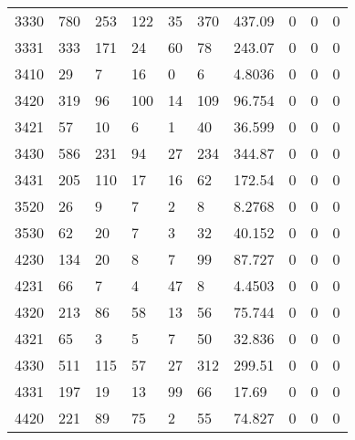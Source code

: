 \begin{longtable}{llllllllll}
3330 & 780           & 253              & 122                & 35               & 370                & 437.09 & 0 & 0 & 0 \\
3331 & 333           & 171              & 24                 & 60               & 78                 & 243.07 & 0 & 0 & 0 \\
3410 & 29            & 7                & 16                 & 0                & 6                  & 4.8036 & 0 & 0 & 0 \\
3420 & 319           & 96               & 100                & 14               & 109                & 96.754 & 0 & 0 & 0 \\
3421 & 57            & 10               & 6                  & 1                & 40                 & 36.599 & 0 & 0 & 0 \\
3430 & 586           & 231              & 94                 & 27               & 234                & 344.87 & 0 & 0 & 0 \\
3431 & 205           & 110              & 17                 & 16               & 62                 & 172.54 & 0 & 0 & 0 \\
3520 & 26            & 9                & 7                  & 2                & 8                  & 8.2768 & 0 & 0 & 0 \\
3530 & 62            & 20               & 7                  & 3                & 32                 & 40.152 & 0 & 0 & 0 \\
4230 & 134           & 20               & 8                  & 7                & 99                 & 87.727 & 0 & 0 & 0 \\
4231 & 66            & 7                & 4                  & 47               & 8                  & 4.4503 & 0 & 0 & 0 \\
4320 & 213           & 86               & 58                 & 13               & 56                 & 75.744 & 0 & 0 & 0 \\
4321 & 65            & 3                & 5                  & 7                & 50                 & 32.836 & 0 & 0 & 0 \\
4330 & 511           & 115              & 57                 & 27               & 312                & 299.51 & 0 & 0 & 0 \\
4331 & 197           & 19               & 13                 & 99               & 66                 & 17.69  & 0 & 0 & 0 \\
4420 & 221           & 89               & 75                 & 2                & 55                 & 74.827 & 0 & 0 & 0 \\

\end{longtable}

